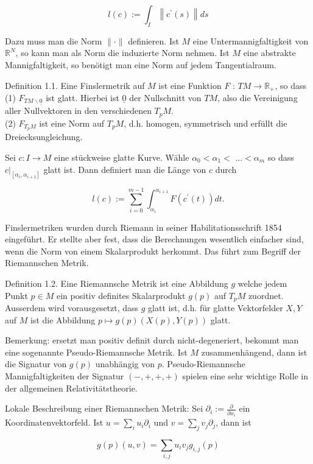 \documentclass[10pt, letterpaper]{article}
\begin{document}
$$
l(c):=\int_{I}\left\|c^{\prime}(s)\right\| d s
$$

Dazu muss man die Norm $\|\cdot\|$ definieren. Ist $M$ eine Untermannigfaltigkeit von $\mathbb{R}^{N}$, so kann man als Norm die induzierte Norm nehmen. Ist $M$ eine abstrakte Mannigfaltigkeit, so benötigt man eine Norm auf jedem Tangentialraum.

Definition 1.1. Eine Finslermetrik auf $M$ ist eine Funktion $F$ : $T M \rightarrow \mathbb{R}_{+}$, so dass\\
(1) $F_{T M \backslash \underline{0}}$ ist glatt. Hierbei ist $\underline{0}$ der Nullschnitt von $T M$, also die Vereinigung aller Nullvektoren in den verschiedenen $T_{p} M$.\\
(2) $F_{T_{p} M}$ ist eine Norm auf $T_{p} M$, d.h. homogen, symmetrisch und erfüllt die Dreiecksungleichung.

Sei $c: I \rightarrow M$ eine stückweise glatte Kurve. Wähle $\alpha_{0}<\alpha_{1}<$ $\ldots<\alpha_{m}$ so dass $\left.c\right|_{\left[\alpha_{i}, \alpha_{i+1}\right]}$ glatt ist. Dann definiert man die Länge von $c$ durch

$$
l(c):=\sum_{i=0}^{m-1} \int_{\alpha_{i}}^{\alpha_{i+1}} F\left(c^{\prime}(t)\right) d t .
$$

Finslermetriken wurden durch Riemann in seiner Habilitationsschrift 1854 eingeführt. Er stellte aber fest, dass die Berechnungen wesentlich einfacher sind, wenn die Norm von einem Skalarprodukt herkommt. Das führt zum Begriff der Riemannschen Metrik.

Definition 1.2. Eine Riemannsche Metrik ist eine Abbildung $g$ welche jedem Punkt $p \in M$ ein positiv definites Skalarprodukt $g(p)$ auf $T_{p} M$ zuordnet. Ausserdem wird vorausgesetzt, dass $g$ glatt ist, d.h. für glatte Vektorfelder $X, Y$ auf $M$ ist die Abbildung $p \mapsto g(p)(X(p), Y(p))$ glatt.

Bemerkung: ersetzt man positiv definit durch nicht-degeneriert, bekommt man eine sogenannte Pseudo-Riemannsche Metrik. Ist $M$ zusammenhängend, dann ist die Signatur von $g(p)$ unabhängig von $p$. Pseudo-Riemannsche Mannigfaltigkeiten der Signatur $(-,+,+,+)$ spielen eine sehr wichtige Rolle in der allgemeinen Relativitätstheorie.

Lokale Beschreibung einer Riemannschen Metrik: Sei $\partial_{i}:=\frac{\partial}{\partial x_{i}}$ ein Koordinatenvektorfeld. Ist $u=\sum_{i} u_{i} \partial_{i}$ und $v=\sum_{j} v_{j} \partial_{j}$, dann ist

$$
g(p)(u, v)=\sum_{i, j} u_{i} v_{j} g_{i, j}(p)
$$
\end{document}
